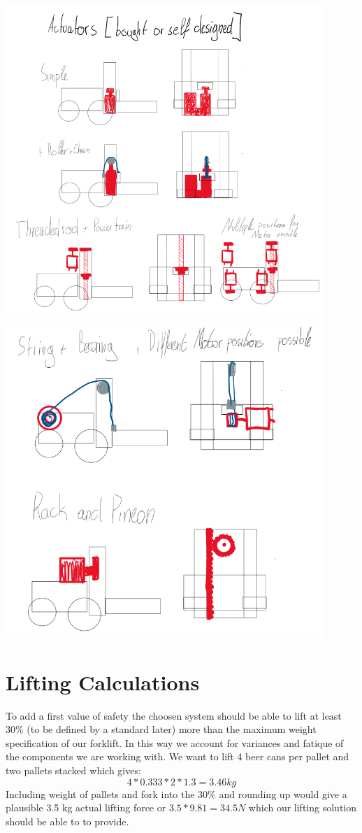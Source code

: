 \documentclass[11pt]{article}
\begin{document}
\begin{center}
    \includegraphics[width=0.9\textwidth]{../image/Liftsolutions1.png}
    \includegraphics[width=0.9\textwidth]{../image/Liftsolutions2.png}
\end{center}
\section{Lifting Calculations}
To add a first value of safety the choosen system should be able to lift at least 30\% (to be defined by a standard later) more than the maximum weight
specification of our forklift. In this way we account for variances and fatique of the components we are working 
with.
We want to lift 4 beer cans per pallet and two pallets stacked which gives:
\[ 4*0.333*2*1.3=3.46kg\]
Including weight of pallets and fork into the 30\% and rounding up would give a plausible 3.5 kg actual lifting force or
\(3.5*9.81=34.5N\) which our lifting solution should be able to to provide.
\end{document}
